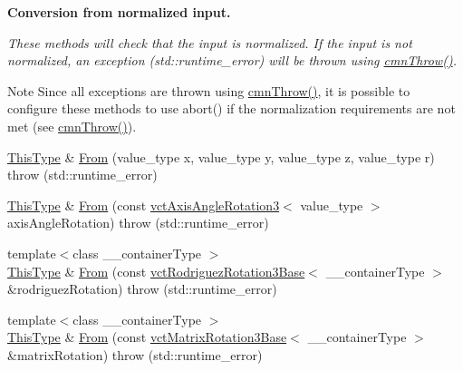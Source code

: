 \begin{Indent}{\bf Conversion from normalized input.}\par
{\em These methods will check that the input is normalized. If the input is not normalized, an exception ({\ttfamily std\-::runtime\-\_\-error}) will be thrown using \hyperlink{_minimal_cmn_8h_ad50e82cf9c9dbd0e6443c13e0d1a6f1a}{cmn\-Throw()}.

\begin{DoxyNote}{Note}
Since all exceptions are thrown using \hyperlink{_minimal_cmn_8h_ad50e82cf9c9dbd0e6443c13e0d1a6f1a}{cmn\-Throw()}, it is possible to configure these methods to use {\ttfamily abort()} if the normalization requirements are not met (see \hyperlink{_minimal_cmn_8h_ad50e82cf9c9dbd0e6443c13e0d1a6f1a}{cmn\-Throw()}). 
\end{DoxyNote}
}\begin{DoxyCompactItemize}
\item 
\hyperlink{classvct_quaternion_base_af28efdc38acf89acb7a67afada11408c}{This\-Type} \& \hyperlink{classvct_quaternion_rotation3_base_a24fb234e60ece7a6b04f6f53339f38fe}{From} (value\-\_\-type x, value\-\_\-type y, value\-\_\-type z, value\-\_\-type r)  throw (std\-::runtime\-\_\-error)
\item 
\hyperlink{classvct_quaternion_base_af28efdc38acf89acb7a67afada11408c}{This\-Type} \& \hyperlink{classvct_quaternion_rotation3_base_a1c2c3f6c860184f92ee7475a18b6f67e}{From} (const \hyperlink{classvct_axis_angle_rotation3}{vct\-Axis\-Angle\-Rotation3}$<$ value\-\_\-type $>$ axis\-Angle\-Rotation)  throw (std\-::runtime\-\_\-error)
\item 
{\footnotesize template$<$class \-\_\-\-\_\-container\-Type $>$ }\\\hyperlink{classvct_quaternion_base_af28efdc38acf89acb7a67afada11408c}{This\-Type} \& \hyperlink{classvct_quaternion_rotation3_base_a7f5cf5bd55cb472c1e18829123b61702}{From} (const \hyperlink{classvct_rodriguez_rotation3_base}{vct\-Rodriguez\-Rotation3\-Base}$<$ \-\_\-\-\_\-container\-Type $>$ \&rodriguez\-Rotation)  throw (std\-::runtime\-\_\-error)
\item 
{\footnotesize template$<$class \-\_\-\-\_\-container\-Type $>$ }\\\hyperlink{classvct_quaternion_base_af28efdc38acf89acb7a67afada11408c}{This\-Type} \& \hyperlink{classvct_quaternion_rotation3_base_ac18f7eca8d1c4cbe11352120ea21f8ef}{From} (const \hyperlink{classvct_matrix_rotation3_base}{vct\-Matrix\-Rotation3\-Base}$<$ \-\_\-\-\_\-container\-Type $>$ \&matrix\-Rotation)  throw (std\-::runtime\-\_\-error)
\end{DoxyCompactItemize}
\end{Indent}
